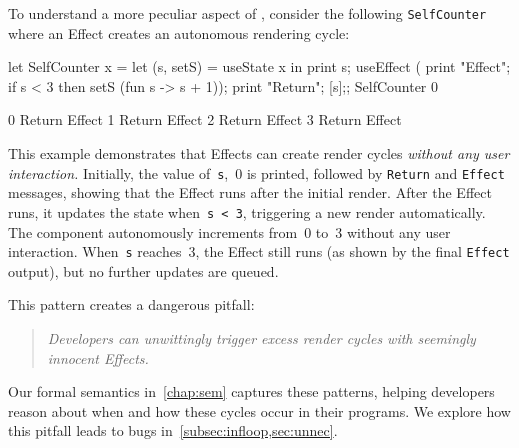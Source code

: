 To understand a more peculiar aspect of , consider the following \texttt{Self\-Counter} where an Effect creates an autonomous rendering cycle:
\begin{center}
  \begin{minipage}{.5\linewidth}
    \begin{reactcode}
let SelfCounter x =
  let (s, setS) = useState x in
  print s;
  useEffect (
    print "Effect";
    if s < 3 then
      setS (fun s -> s + 1));
  print "Return";
  [s];;
SelfCounter 0
    \end{reactcode}
  \end{minipage}
  \begin{minipage}{.3\linewidth}
    \begin{console}
0
Return
Effect
1
Return
Effect
2
Return
Effect
3
Return
Effect
    \end{console}
  \end{minipage}
\end{center}
This example demonstrates that Effects can create render cycles \emph{without any user interaction.}
Initially, the value of~\verb+s+,~0 is printed, followed by \verb+Return+ and \verb+Effect+ messages, showing that the Effect runs after the initial render.
After the Effect runs, it updates the state when~\verb+s < 3+, triggering a new render automatically.
The component autonomously increments from~0 to~3 without any user interaction.
When~\verb+s+ reaches~3, the Effect still runs (as shown by the final \verb+Effect+ output), but no further updates are queued.

This pattern creates a dangerous pitfall:
\begin{quote}
  \emph{Developers can unwittingly trigger excess render cycles with seemingly innocent Effects.}
\end{quote}
Our formal semantics in~\cref{chap:sem} captures these patterns, helping developers reason about when and how these cycles occur in their programs.
We explore how this pitfall leads to bugs in~\cref{subsec:infloop,sec:unnec}.
